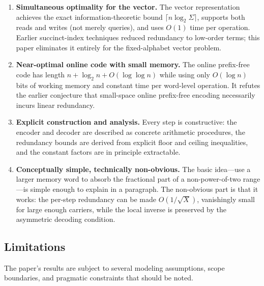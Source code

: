 \begin{enumerate}[label=(\arabic*)]
\item \textbf{Simultaneous optimality for the vector.}
  The vector representation achieves the exact information-theoretic bound
  $\lceil n\log_2\Sigma\rceil$, supports both reads and writes (not merely
  queries), and uses $O(1)$ time per operation.  Earlier succinct-index
  techniques reduced redundancy to low-order terms; this paper eliminates it
  entirely for the fixed-alphabet vector problem.

\item \textbf{Near-optimal online code with small memory.}
  The online prefix-free code has length $n+\log_2n+O(\log\log n)$ while
  using only $O(\log n)$ bits of working memory and constant time per
  word-level operation.  It refutes the earlier conjecture that small-space
  online prefix-free encoding necessarily incurs linear redundancy.

\item \textbf{Explicit construction and analysis.}
  Every step is constructive: the encoder and decoder are described as
  concrete arithmetic procedures, the redundancy bounds are derived from
  explicit floor and ceiling inequalities, and the constant factors are in
  principle extractable.

\item \textbf{Conceptually simple, technically non-obvious.}
  The basic idea---use a larger memory word to absorb the fractional part of a
  non-power-of-two range---is simple enough to explain in a paragraph.  The
  non-obvious part is that it works: the per-step redundancy can be made
  $O(1/\sqrt{X})$, vanishingly small for large enough carriers, while the
  local inverse is preserved by the asymmetric decoding condition.

\end{enumerate}

\subsection{Limitations}

The paper's results are subject to several modeling assumptions, scope
boundaries, and pragmatic constraints that should be noted.


